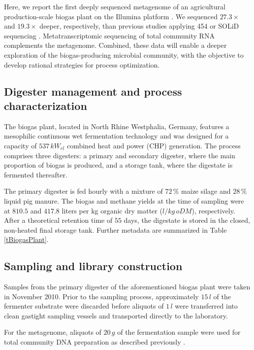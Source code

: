 \documentclass{bmcart}
\begin{document}
Here, we report the first deeply sequenced metagenome of an agricultural production-scale biogas plant on the Illumina platform \cite{GigaDB}.
We sequenced $27.3 \times$ and $19.3 \times$ deeper, respectively, than previous studies applying 454 or SOLiD sequencing \cite{Jaenicke2011, Wirth2012}. Metatranscriptomic sequencing of total community RNA complements the metagenome.
Combined, these data will enable a deeper exploration of the biogas-producing microbial community, with the objective to develop rational strategies for process optimization.

\subsection*{Digester management and process characterization}
The biogas plant, located in North Rhine Westphalia, Germany, features a mesophilic continuous wet fermentation technology and was designed for a capacity of $537\,kW_{el}$ combined heat and power (CHP) generation.
The process comprises three digesters: a primary and secondary digester, where the main proportion of biogas is produced, and a storage tank, where the digestate is fermented thereafter.

The primary digester is fed hourly with a mixture of $72\,\%$ maize silage and $28\,\%$ liquid pig manure.
The biogas and methane yields at the time of sampling were at $810.5$ and $417.8$ liters per kg organic dry matter ($l / kg\,oDM$), respectively.
After a theoretical retention time of $55$ days, the digestate is stored in the closed, non-heated final storage tank.
Further metadata are summarized in Table \ref{tBiogasPlant}.

\subsection*{Sampling and library construction}
Samples from the primary digester of the aforementioned biogas plant were taken in November 2010.
Prior to the sampling process, approximately $15\,l$ of the fermenter substrate were discarded before aliquots of $1\,l$ were transferred into clean gastight sampling vessels and transported directly to the laboratory.

For the metagenome, aliquots of $20\,g$ of the fermentation sample were used for total community DNA preparation as described previously \cite{Schlueter2008}.
\end{document}
